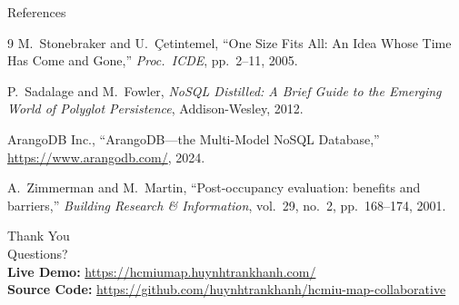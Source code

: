 \documentclass[aspectratio=169,11pt]{beamer}
\begin{document}
\begin{frame}{References}
  \begin{thebibliography}{9}
    M.~Stonebraker and U.~\c{C}etintemel,
    ``One Size Fits All: An Idea Whose Time Has Come and Gone,''
    \emph{Proc.\ ICDE}, pp.~2--11, 2005.

    P.~Sadalage and M.~Fowler,
    \emph{NoSQL Distilled: A Brief Guide to the Emerging World of
    Polyglot Persistence},
    Addison-Wesley, 2012.

    ArangoDB Inc.,
    ``ArangoDB---the Multi-Model NoSQL Database,''
    \url{https://www.arangodb.com/}, 2024.

    A.~Zimmerman and M.~Martin,
    ``Post-occupancy evaluation: benefits and barriers,''
    \emph{Building Research \& Information},
    vol.~29, no.~2, pp.~168--174, 2001.
  \end{thebibliography}
\end{frame}

\begin{frame}
  \begin{center}
    \vfill
    {\Huge Thank You}\\[1em]
    {\Large Questions?}\\[1.5em]
    {\normalsize
      \textbf{Live Demo:} \url{https://hcmiumap.huynhtrankhanh.com/}\\[0.3em]
      \textbf{Source Code:} \url{https://github.com/huynhtrankhanh/hcmiu-map-collaborative}
    }
    \vfill
  \end{center}
\end{frame}
\end{document}
